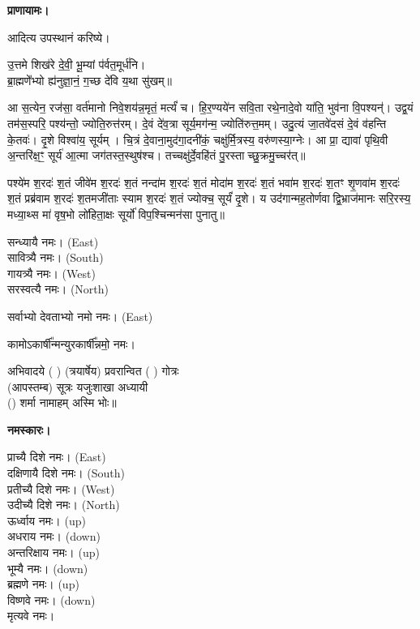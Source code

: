 \textbf{प्राणायामः।}


आदित्य उपस्थानं करिष्ये।

उ॒त्तमे शिख॑रे दे॒वी॒ भू॒म्यां प॑र्वत॒मूर्ध॑नि।\\
ब्रा॒ह्मणे॑॑भ्यो ह्य॑नुज्ञा॒नं॒ ग॒च्छ दे॑वि य॒था सु॑खम्॥



आ स॒त्येन॒ रज॑सा॒ वर्त॑मानो निवे॒शय॑न्न॒मृतं॒ मर्त्यं॑ च। हि॒र॒ण्यये॑न सवि॒ता रथे॒नादे॒वो या॑ति॒ भुव॑ना वि॒पश्यन्॑। उद्व॒यं तम॑स॒स्परि॒ पश्य॑न्तो॒ ज्योति॒रुत्त॑रम्। दे॒वं दे॑व॒त्रा सूर्य॒मग॑न्म॒ ज्योति॑रुत्त॒मम्। उदु॒त्यं जा॒तवे॑दसं दे॒वं व॑हन्ति के॒तवः॑। दृ॒शे विश्वा॑य॒ सूर्यम्। चि॒त्रं दे॒वाना॒मुद॑गा॒दनी॑कं॒ चक्षु॑र्मि॒त्रस्य॒ वरु॑णस्या॒ग्नेः। आ प्रा॒ द्यावा॑ पृथि॒वी अ॒न्तरि॑क्ष॒ꣳ॒ सूर्य॑ आ॒त्मा जग॑तस्त॒स्थुष॑श्च। तच्चक्षु॑र्दे॒वहि॑तं पु॒रस्ताच्छु॒क्रमु॒च्चर॑त्॥

पश्ये॑म श॒रदः॑ श॒तं जीवे॑म श॒रदः॑ श॒तं नन्दा॑म श॒रदः॑ श॒तं मोदा॑म श॒रदः॑ श॒तं भवा॑म श॒रदः॑ श॒तꣳ शृ॒णवा॑म श॒रदः॑ श॒तं प्रब्र॑वाम श॒रदः॑ श॒तमजी॑ताः स्याम श॒रदः॑ श॒तं ज्योक्च॒ सूर्यं॑ दृ॒शे। य उद॑गान्मह॒तोर्णवाद्वि॒भ्राज॑मानः सरि॒रस्य॒ मध्या॒थ्स मा॑ वृष॒भो लो॑हिता॒क्षः सूर्यो॑ विप॒श्चिन्मन॑सा पुनातु॥



सन्ध्यायै नमः।  {\scriptsize (East)}\\
सावित्र्यै नमः। {\scriptsize (South)}\\
गायत्र्यै नमः।  {\scriptsize (West)}\\
सरस्वत्यै नमः।  {\scriptsize (North)}

सर्वाभ्यो देवताभ्यो नमो नमः। {\scriptsize (East)}

कामोऽकार्\mbox{}षी᳚न्मन्युरकार्\mbox{}षी᳚न्नमो॒ नमः।

अभिवादये ( ) (त्रयार्षेय) प्रवरान्वित ( ) गोत्रः\\
(आपस्तम्ब) सूत्रः यजुःशाखा अध्यायी\\
() शर्मा नामाहम् अस्मि भोः॥

\textbf{नमस्कारः।}


प्राच्यै दिशे नमः।   {\scriptsize (East)}\\
दक्षिणायै दिशे नमः।  {\scriptsize (South)}\\
प्रतीच्यै दिशे नमः।   {\scriptsize (West)}\\
उदीच्यै दिशे नमः।   {\scriptsize (North)}\\
ऊर्ध्वाय नमः।   {\scriptsize (up)}\\
अधराय नमः।   {\scriptsize (down)}\\
अन्तरिक्षाय नमः। {\scriptsize (up)}\\
भूम्यै नमः। {\scriptsize (down)}\\
ब्रह्मणे नमः। {\scriptsize (up)}\\
विष्णवे नमः।  {\scriptsize (down)}\\
मृत्यवे नमः।

